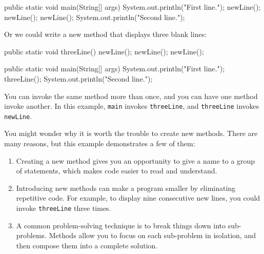 \documentclass[12pt]{book}
\theoremstyle{exercise}
\newcommand{\java}[1]{\verb"#1"}
\begin{document}
\begin{code}
    public static void main(String[] args) {
        System.out.println("First line.");
        newLine();
        newLine();
        newLine();
        System.out.println("Second line.");
    }
\end{code}

Or we could write a new method that displays three blank lines:

\begin{code}
    public static void threeLine() {
        newLine();
        newLine();
        newLine();
    }

    public static void main(String[] args) {
        System.out.println("First line.");
        threeLine();
        System.out.println("Second line.");
    }
\end{code}

You can invoke the same method more than once, and you can have one method invoke another.
In this example, \java{main} invokes \java{threeLine}, and \java{threeLine} invokes \java{newLine}.

You might wonder why it is worth the trouble to create new methods.
There are many reasons, but this example demonstrates a few of them:

\begin{enumerate}

\item Creating a new method gives you an opportunity to give a name to a group of statements, which makes code easier to read and understand.

\item Introducing new methods can make a program smaller by eliminating repetitive code.
For example, to display nine consecutive new lines, you could invoke \java{threeLine} three times.

\item A common problem-solving technique is to break things down into sub-problems.
Methods allow you to focus on each sub-problem in isolation, and then compose them into a complete solution.

\end{enumerate}

\end{document}
